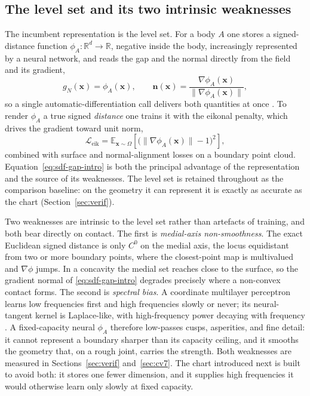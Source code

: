 \documentclass{svjour3}                 %
\newcommand{\R}{\mathbb{R}}
\newcommand{\norm}[1]{\lVert#1\rVert}
\newcommand{\nbf}{\bm{n}}
\newcommand{\xbf}{\bm{x}}
\newcommand{\gn}{g_{\scriptscriptstyle N}}
\newcommand{\grad}{\nabla}
\begin{document}
\subsection{The level set and its two intrinsic weaknesses}\label{sec:intro-levelset}

The incumbent representation is the level set. For a body $A$ one stores a signed-distance function
$\phi_A:\R^d\to\R$, negative inside the body, increasingly represented by a neural network, and reads the
gap and the normal directly from the field and its gradient,
\begin{equation}
  \gn(\xbf)=\phi_A(\xbf),\qquad
  \nbf(\xbf)=\frac{\grad\phi_A(\xbf)}{\norm{\grad\phi_A(\xbf)}},
  \label{eq:sdf-gap-intro}
\end{equation}
so a single automatic-differentiation call delivers both quantities at once \citep{liu2020implicit,
kolev2003level}. To render $\phi_A$ a true signed \emph{distance} one trains it with the eikonal penalty,
which drives the gradient toward unit norm,
\begin{equation}
  \mathcal{L}_{\mathrm{eik}}
  =\mathbb{E}_{\xbf\sim\Omega}\!\left[\big(\norm{\grad\phi_A(\xbf)}-1\big)^2\right],
  \label{eq:eikonal}
\end{equation}
combined with surface and normal-alignment losses on a boundary point cloud. Equation~\eqref{eq:sdf-gap-intro}
is both the principal advantage of the representation and the source of its weaknesses. The level set is
retained throughout as the comparison baseline: on the geometry it can represent it is exactly as accurate as
the chart (Section~\ref{sec:verif}).

Two weaknesses are intrinsic to the level set rather than artefacts of training, and both bear directly on
contact. The first is \emph{medial-axis non-smoothness}. The exact Euclidean signed distance is only $C^0$
on the medial axis, the locus equidistant from two or more boundary points, where the closest-point map is
multivalued and $\grad\phi$ jumps. In a concavity the medial set reaches close to the surface, so the
gradient normal of \eqref{eq:sdf-gap-intro} degrades precisely where a non-convex contact forms. The second
is \emph{spectral bias}. A coordinate multilayer perceptron learns low frequencies first and high
frequencies slowly or never; its neural-tangent kernel is Laplace-like, with high-frequency power decaying
with frequency \citep{rahaman2019spectral}. A fixed-capacity neural $\phi_A$ therefore low-passes cusps,
asperities, and fine detail: it cannot represent a boundary sharper than its capacity ceiling, and it
smooths the geometry that, on a rough joint, carries the strength. Both weaknesses are measured in
Sections~\ref{sec:verif} and~\ref{sec:cv7}. The chart introduced next is built to avoid
both: it stores one fewer dimension, and it supplies high frequencies it would otherwise learn only slowly at
fixed capacity.
\end{document}
